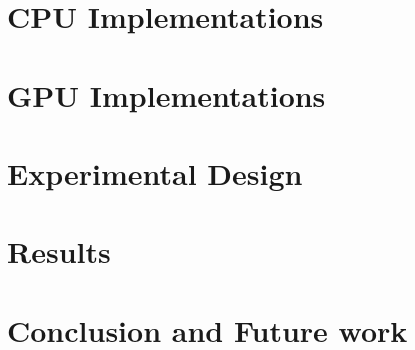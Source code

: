 \documentclass[sigconf, noacm = true, 11pt]{acmart}
\begin{document}
\section{CPU Implementations}
\label{sec:cpu}


\section{GPU Implementations}
\label{sec:gpu}


\section{Experimental Design}
\label{sec:expdesign}


\section{Results}
\label{sec:results}


\section{Conclusion and Future work}
\label{sec:conclusion}



\newpage


\end{document}
